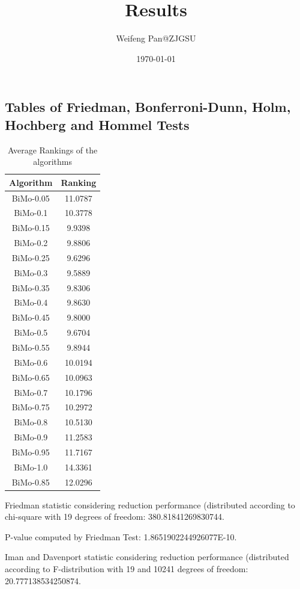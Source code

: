 \documentclass[a4paper,10pt]{article}
\title{Results}
\author{Weifeng Pan@ZJGSU}
\date{\today}
\begin{document}
\begin{landscape}
\oddsidemargin 0in \topmargin 0in\maketitle
\section{Tables of Friedman, Bonferroni-Dunn, Holm, Hochberg and Hommel Tests}
\begin{table}[!htp]
\centering
\caption{Average Rankings of the algorithms
}\begin{tabular}{c|c}
Algorithm&Ranking\\
\hline
BiMo-0.05&11.0787\\
BiMo-0.1&10.3778\\
BiMo-0.15&9.9398\\
BiMo-0.2&9.8806\\
BiMo-0.25&9.6296\\
BiMo-0.3&9.5889\\
BiMo-0.35&9.8306\\
BiMo-0.4&9.8630\\
BiMo-0.45&9.8000\\
BiMo-0.5&9.6704\\
BiMo-0.55&9.8944\\
BiMo-0.6&10.0194\\
BiMo-0.65&10.0963\\
BiMo-0.7&10.1796\\
BiMo-0.75&10.2972\\
BiMo-0.8&10.5130\\
BiMo-0.9&11.2583\\
BiMo-0.95&11.7167\\
BiMo-1.0&14.3361\\
BiMo-0.85&12.0296\\
\end{tabular}
\end{table}


Friedman statistic considering reduction performance (distributed according to chi-square with 19 degrees of freedom: 380.81841269830744.


P-value computed by Friedman Test: 1.8651902244926077E-10.\newline

Iman and Davenport statistic considering reduction performance (distributed according to F-distribution with 19 and 10241 degrees of freedom: 20.777138534250874.



\end{landscape}
\end{document}
